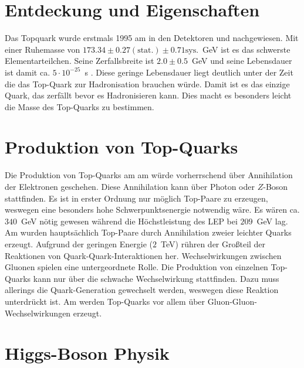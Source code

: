  \section{Entdeckung und Eigenschaften}
 Das Topquark wurde erstmals 1995 am \tevatron in den Detektoren \dzero und \cdf nachgewiesen. Mit einer Ruhemasse von $173.34 \pm 0.27(\text{stat.}) \pm 0.71 \text{sys.}$~GeV ist es das schwerste Elementarteilchen. Seine Zerfallsbreite ist $2.0\pm0.5$~GeV und seine Lebensdauer ist damit ca. $5\cdot10^{-25}$~s . Diese geringe Lebensdauer liegt deutlich unter der Zeit die das Top-Quark zur Hadronisation brauchen würde. Damit ist es das einzige Quark, das zerfällt bevor es Hadronisieren kann. Dies macht es besonders leicht die Masse des Top-Quarks zu bestimmen.
 
 \section{Produktion von Top-Quarks}
 Die Produktion von Top-Quarks am \lep am \cern würde vorherrschend über Annihilation der Elektronen geschehen. Diese Annihilation kann über Photon oder $Z$-Boson stattfinden. Es ist in erster Ordnung nur möglich Top-Paare zu erzeugen, weswegen eine besonders hohe Schwerpunktsenergie notwendig wäre. Es wären ca. $340$~GeV nötig gewesen während die Höchstleistung des LEP bei $209$~GeV lag. Am \tevatron wurden hauptsächlich Top-Paare durch Annihilation zweier leichter Quarks erzeugt. Aufgrund der geringen Energie ($2$~TeV) rühren der Großteil der Reaktionen von Quark-Quark-Interaktionen her. Wechselwirkungen zwischen Gluonen spielen eine untergeordnete Rolle. Die Produktion von einzelnen Top-Quarks kann nur über die schwache Wechselwirkung stattfinden. Dazu muss allerings die Quark-Generation gewechselt werden, weswegen diese Reaktion unterdrückt ist. 
 Am \lhc werden Top-Quarks vor allem über Gluon-Gluon-Wechselwirkungen erzeugt. 

 \section{Higgs-Boson Physik}


